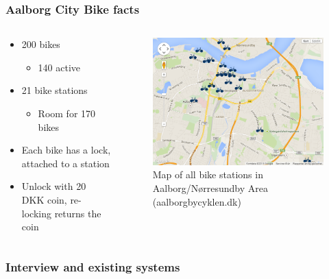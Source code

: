 \begin{frame}
\frametitle{Aalborg City Bike facts}
\begin{columns}
\begin{column}{.44\textwidth}
\begin{itemize}
\item 200 bikes
\begin{itemize}
\item 140 active
\end{itemize}
\item 21 bike stations
\begin{itemize}
\item Room for 170 bikes
\end{itemize}
\item Each bike has a lock, attached to a station
\item Unlock with 20 DKK coin, re-locking returns the coin
\end{itemize}
\end{column}
\begin{column}{.44\textwidth}
\begin{figure}
\includegraphics[width=\textwidth]{graphics/acb_gmaps}
\caption{Map of all bike stations in Aalborg/Nørresundby Area (aalborgbycyklen.dk)}
\end{figure}
\end{column}
\end{columns}
\end{frame}

\begin{frame}
\frametitle{Interview and existing systems}

\end{frame}

